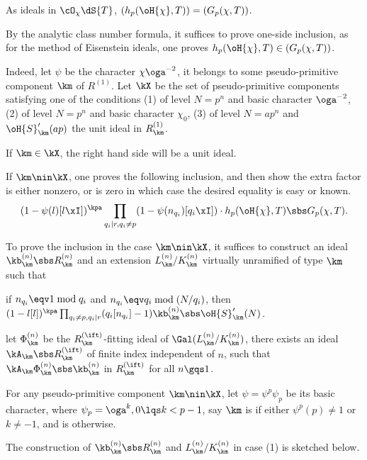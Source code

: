 \documentclass[article, a4paper, twoside]{universal}
\begin{document}
\begin{thm}[{\cite[1.9~Theorem]{MW1984}}]\label{thm:main}
	As ideals in $\cO_{\chi}\dS{T}$, $(h_{p}(\oH{\chi},T))=(G_{p}(\chi,T))$.
\end{thm}

\begin{prf}
	By the analytic class number formula, it suffices to prove one-side inclusion, as for the method of Eisenstein ideals, one proves $h_{p}(\oH{\chi},T)\in(G_{p}(\chi,T))$.

	Indeed, let $\psi$ be the character $\chi\oga^{-2}$, it belongs to some pseudo-primitive component $\km$ of $R^{(1)}$. Let $\kX$ be the set of pseudo-primitive components satisfying one of the conditions (1) of level $N=p^{n}$ and basic character $\oga^{-2}$, (2) of level $N=p^{n}$ and basic character $\chi_{0}$, (3) of level $N=ap^{n}$ and $\oH{S}_{\km}'(ap)$ the unit ideal in $R_{\km}^{(1)}$.


	\begin{itm}
		\item If $\km\in\kX$, the right hand side will be a unit ideal.
		\item If $\km\nin\kX$, one proves the following inclusion, and then show the extra factor is either nonzero, or is zero in which case the desired equality is easy or known.
		\[
			(1-\psi(l)[l\xI])^{\kpa}\prod_{q_{i}\mid r, q_{i}\neq p}(1-\psi(n_{q_{i}})[q_{i}\xI])\cdot h_{p}(\oH{\chi},T)\sbs G_{p}(\chi,T).
		\]
	\end{itm}

	To prove the inclusion in the case $\km\nin\kX$, it suffices to construct an ideal $\kb_{\km}^{(n)}\sbs R_{\km}^{(n)}$ and an extension $L_{\km}^{(n)}/K_{\km}^{(n)}$ virtually unramified of type $\km$ such that
	\begin{enr}[label=(\arabic*)]
		\item if $n_{q_{i}}\eqv1\bmod{q_{i}}$ and $n_{q_{i}}\eqv q_{i}\bmod{(N/q_{i})}$, then $(1-l[l])^{\kpa}\prod_{q_{i}\neq p, q_{i}\mid r}(q_{i}[n_{q_{i}}]-1)\kb_{\km}^{(n)}\sbs\oH{S}_{\km}'(N)$.
		\item let $\Phi_{\km}^{(n)}$ be the $R_{\km}^{(\ift)}$-fitting ideal of $\Gal(L_{\km}^{(n)}/K_{\km}^{(n)})$, there exists an ideal $\kA_{\km}\sbs R_{\km}^{(\ift)}$ of finite index independent of $n$, such that $\kA_{\km}\Phi_{\km}^{(n)}\sbs\kb_{\km}^{(n)}$ in $R_{\km}^{(\ift)}$ for all $n\gqs1$.
	\end{enr}

	For any pseudo-primitive component $\km\nin\kX$, let $\psi=\psi^{p}\psi_{p}$ be its basic character, where $\psi_{p}=\oga^{k}, 0\lqs k<p-1$, say $\km$ is  if either $\psi^{p}(p)\neq1$ or $k\neq-1$, and is  otherwise.

	The construction of $\kb_{\km}^{(n)}\sbs R_{\km}^{(n)}$ and $L_{\km}^{(n)}/K_{\km}^{(n)}$ in case (1) is sketched below.
\end{prf}
\end{document}
